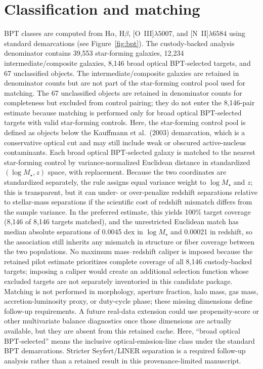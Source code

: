 \documentclass[twocolumn]{aastex631}
\begin{document}
\section{Classification and matching}
BPT classes are computed from H$\alpha$, H$\beta$, [O~III]$\lambda5007$, and [N~II]$\lambda6584$ using standard demarcations \citep{baldwin1981,kewley2001,kauffmann2003bpt,kewley2006} (see Figure~\ref{fig:bpt}). The custody-backed analysis denominator contains 39,553 star-forming galaxies, 12,234 intermediate/composite galaxies, 8,146 broad optical BPT-selected targets, and 67 unclassified objects. The intermediate/composite galaxies are retained in denominator counts but are not part of the star-forming control pool used for matching. The 67 unclassified objects are retained in denominator counts for completeness but excluded from control pairing; they do not enter the 8,146-pair estimate because matching is performed only for broad optical BPT-selected targets with valid star-forming controls. Here, the star-forming control pool is defined as objects below the Kauffmann et al.\ (2003) demarcation, which is a conservative optical cut and may still include weak or obscured active-nucleus contaminants. Each broad optical BPT-selected galaxy is matched to the nearest star-forming control by variance-normalized Euclidean distance in standardized $(\log M_\star,z)$ space, with replacement. Because the two coordinates are standardized separately, the rule assigns equal variance weight to $\log M_\star$ and \(z\); this is transparent, but it can under- or over-penalize redshift separations relative to stellar-mass separations if the scientific cost of redshift mismatch differs from the sample variance. In the preferred estimate, this yields 100\% target coverage (8,146 of 8,146 targets matched), and the unrestricted Euclidean match has median absolute separations of 0.0045 dex in $\log M_\star$ and 0.00021 in redshift, so the association still inherits any mismatch in structure or fiber coverage between the two populations. No maximum mass--redshift caliper is imposed because the retained pilot estimate prioritizes complete coverage of all 8,146 custody-backed targets; imposing a caliper would create an additional selection function whose excluded targets are not separately inventoried in this candidate package. Matching is not performed in morphology, aperture fraction, halo mass, gas mass, accretion-luminosity proxy, or duty-cycle phase; these missing dimensions define follow-up requirements. A future real-data extension could use propensity-score or other multivariate balance diagnostics once those dimensions are actually available, but they are absent from this retained cache.
Here, ``broad optical BPT-selected'' means the inclusive optical-emission-line class under the standard BPT demarcations. Stricter Seyfert/LINER separation is a required follow-up analysis rather than a retained result in this provenance-limited manuscript.
\end{document}
